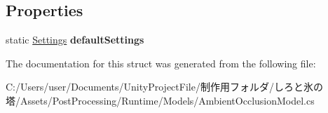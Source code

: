 \subsection*{Properties}
\begin{DoxyCompactItemize}
\item 
\mbox{\label{struct_unity_engine_1_1_post_processing_1_1_ambient_occlusion_model_1_1_settings_a1a2d8b2ae93f327b3365648d7abf25f1}} 
static \hyperlink{struct_unity_engine_1_1_post_processing_1_1_ambient_occlusion_model_1_1_settings}{Settings} {\bfseries default\+Settings}
\end{DoxyCompactItemize}


The documentation for this struct was generated from the following file\+:\begin{DoxyCompactItemize}
\item 
C\+:/\+Users/user/\+Documents/\+Unity\+Project\+File/制作用フォルダ/しろと氷の塔/\+Assets/\+Post\+Processing/\+Runtime/\+Models/Ambient\+Occlusion\+Model.\+cs\end{DoxyCompactItemize}
